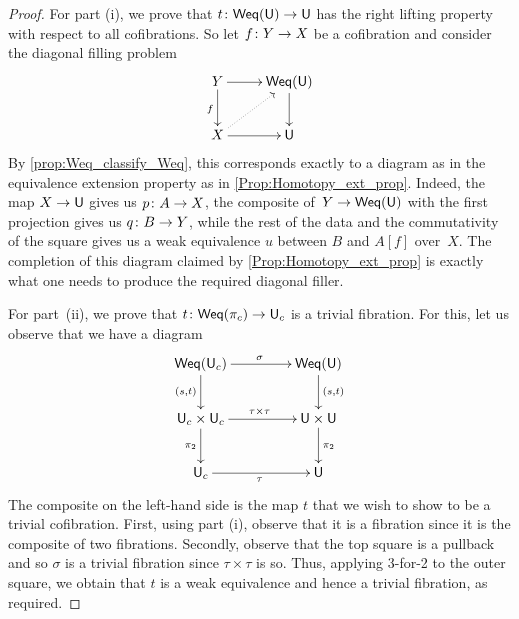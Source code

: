 \documentclass[reqno,10pt,a4paper,oneside,draft]{amsart}
\begin{document}
\begin{proof} For part (i), we prove that $t \colon  \mathsf{Weq}(\mathsf{U}) \to \mathsf{U}$ has the right lifting property with respect
to all cofibrations. So let $f \colon Y \rightarrow X$ be a cofibration and consider the diagonal
filling problem
\[
\xymatrix{Y \ar[d]_f \ar[r] & \mathsf{Weq}(\U) \ar[d] \\
X \ar[r] \ar@{.>}[ur]  & \U 
}
\]
By  \cref{prop:Weq_classify_Weq}, this corresponds exactly to a diagram as in the equivalence extension property as in \cref{Prop:Homotopy_ext_prop}. Indeed, the map $X \rightarrow \mathsf{U}$ gives us
$p \colon A \to X$, the composite of~$Y \rightarrow  \mathsf{Weq}(\mathsf{U})$ with the first projection
gives us $q \colon B \to Y$, while the rest of the data and the commutativity of the square 
gives us a weak equivalence $u$ between $B$ and $A[f]$ over~$X$. The completion of this diagram claimed by \cref{Prop:Homotopy_ext_prop} is exactly what one needs to produce the required diagonal filler.

For part~(ii), we prove that $t \colon \mathsf{Weq}(\pi_c) \to \mathsf{U}_c$ is a trivial fibration. For this, let us
observe that we have a diagram 
\[
\xymatrix@C=1.5cm{
\Weq(\U_c) \ar[r]^{\sigma}  \ar[d]_{(s,t)} & \Weq(\U) \ar[d]^{(s,t)} \\
\U_c \times \U_c \ar[r]^{\tau \times \tau} \ar[d]_{\pi_2} & \U \times \U \ar[d]^{\pi_2} \\
\U_c \ar[r]_\tau & \U }
\]
The composite  on the left-hand side is the map $t$ that we wish to show to be a trivial cofibration.
First, using part (i), observe that it is a fibration since it is the composite of two fibrations. Secondly,
observe that the top square is a pullback and so $\sigma$ is a trivial fibration since $\tau \times \tau$ 
is so. Thus, applying 3-for-2 to the outer square, we obtain that $t$ is a weak equivalence and hence
a trivial fibration, as required.
\end{proof} 















\end{document}
